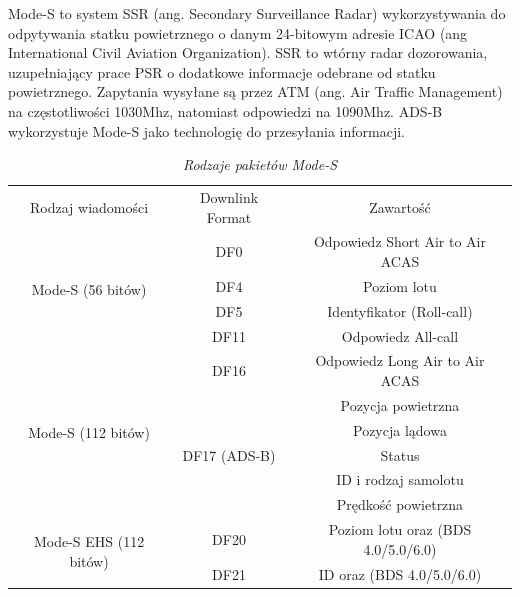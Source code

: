 \documentclass[eng,printmode]{mgr}
\begin{document}
Mode-S to system SSR (ang. Secondary Surveillance Radar) wykorzystywania do odpytywania statku powietrznego o danym 24-bitowym adresie ICAO (ang International Civil Aviation Organization). SSR to wtórny radar dozorowania, uzupełniający prace PSR o dodatkowe informacje odebrane od statku powietrznego. Zapytania wysyłane są przez ATM (ang. Air Traffic Management) na częstotliwości 1030Mhz, natomiast odpowiedzi na 1090Mhz. ADS-B wykorzystuje Mode-S jako technologię do przesyłania informacji.
\begin{table}[ph]
\caption{\textit{ Rodzaje pakietów Mode-S}}
\label{tab:adsb}
  \centering
  \def\arraystretch{1.3}%
  \begin{tabular}{|c|c|c|}
  \hline
  \multicolumn{1}{|c|}{Rodzaj wiadomości} & \multicolumn{1}{c|}{Downlink Format} & \multicolumn{1}{c|}{Zawartość} \\\cline{1-3}
  \multirow{4}{*}{Mode-S (56 bitów)} 
  				 & \multicolumn{1}{c|}{DF0} & \multicolumn{1}{c|}{Odpowiedz Short Air to Air ACAS} \\\cline{2-3}
                 & \multicolumn{1}{c|}{DF4} & \multicolumn{1}{c|}{Poziom lotu} \\\cline{2-3}
                 & \multicolumn{1}{c|}{DF5} & \multicolumn{1}{c|}{Identyfikator (Roll-call)} \\\cline{2-3}
                 & \multicolumn{1}{c|}{DF11} & \multicolumn{1}{c|}{Odpowiedz All-call} \\\hline
  \multirow{6}{*}{Mode-S (112 bitów)} 
  				 & \multicolumn{1}{c|}{DF16} & \multicolumn{1}{c|}{Odpowiedz Long Air to Air ACAS} \\\cline{2-3}
                 & \multirow{5}{*}{DF17 (ADS-B)} & Pozycja powietrzna \\\hhline{~~~} 
                 &                       & Pozycja lądowa \\\hhline{~~~} 
                 &                       & Status \\\hhline{~~~} 
                 &                       & ID i rodzaj samolotu  \\\hhline{~~~} 
                 &                       & Prędkość powietrzna \\\hline
 \multirow{2}{*}{Mode-S EHS (112 bitów)} 
	& \multicolumn{1}{c|}{DF20} & \multicolumn{1}{c|}{Poziom lotu oraz (BDS 4.0/5.0/6.0)} \\\cline{2-3}
	& \multicolumn{1}{c|}{DF21} & \multicolumn{1}{c|}{ID oraz (BDS 4.0/5.0/6.0)} \\\hline
 \end{tabular}
\end{table}
\newpage
\end{document}
